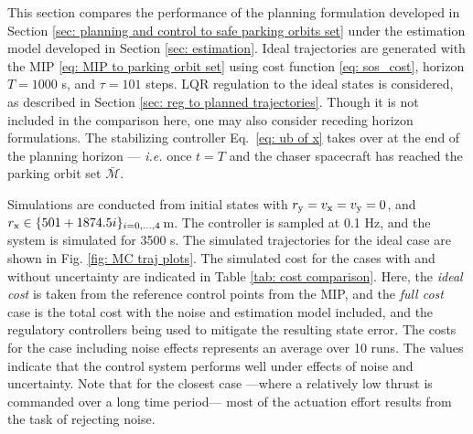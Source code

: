 \documentclass[twocolumn,letterpaper]{IEEEAerospaceCLS}  %
\theoremstyle{definition}
\begin{document}
This section compares the performance of the planning formulation developed in Section \ref{sec: planning and control to safe parking orbits set} under the estimation model developed in Section \ref{sec: estimation}.
Ideal trajectories are generated with the MIP \eqref{eq: MIP to parking orbit set} using cost function \eqref{eq: sos_cost}, horizon $T=1000$ s, and $\tau = 101$ steps. 
LQR regulation to the ideal states is considered, as described in Section \ref{sec: reg to planned trajectories}. 
Though it is not included in the comparison here, one may also consider receding horizon formulations. 
The stabilizing controller Eq.~\eqref{eq: ub of x} takes over at the end of the planning horizon --- \emph{i.e.} once $t=T$ and the chaser spacecraft has reached the parking orbit set $\bar{{\mathcal{M}}}$. 


Simulations are conducted from initial states with $r_{{\rm y}}=v_{{\rm x}}=v_{{\rm y}}=0$, and $r_{{\rm x}}\in\{501+1874.5i\}_{ i=0,...,4 }\, $m.
The controller is sampled at 0.1 Hz, and the system is simulated for 3500 s. 
The simulated trajectories for the ideal case are shown in Fig. \ref{fig: MC traj plots}.
The simulated cost for the cases with and without uncertainty are indicated in Table \ref{tab: cost comparison}. 
Here, the \textit{ideal cost} is taken from the reference control points from the MIP, and 
the \textit{full cost} case is the total cost with
the noise and estimation model included, and the regulatory controllers being used to mitigate the resulting state error. 
The costs for the case including noise effects represents an average over 10 runs. 
The values indicate that the control system performs well under effects of noise and uncertainty. 
Note that for the closest case ---where a relatively low thrust is commanded over a long time period--- most of the actuation effort results from the task of rejecting noise. 




\end{document}
